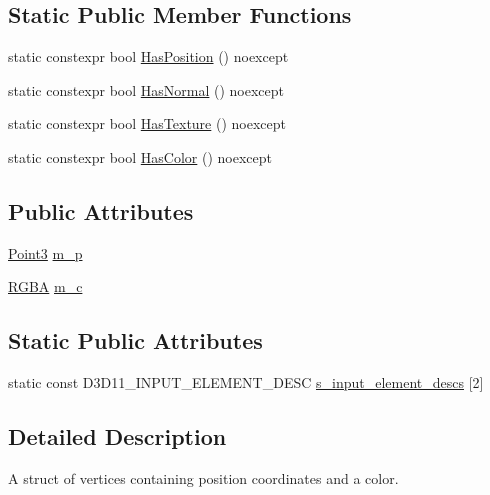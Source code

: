 \subsection*{Static Public Member Functions}
\begin{DoxyCompactItemize}
\item 
static constexpr bool \mbox{\hyperlink{structmage_1_1rendering_1_1_vertex_position_color_a9a905a75c75030b37575a7b65dff61b0}{Has\+Position}} () noexcept
\item 
static constexpr bool \mbox{\hyperlink{structmage_1_1rendering_1_1_vertex_position_color_a95f2749a6f879b4123034a78c504f3c5}{Has\+Normal}} () noexcept
\item 
static constexpr bool \mbox{\hyperlink{structmage_1_1rendering_1_1_vertex_position_color_a1498641d42122251a8612b7b40d171da}{Has\+Texture}} () noexcept
\item 
static constexpr bool \mbox{\hyperlink{structmage_1_1rendering_1_1_vertex_position_color_aea75d3acadad3cd6da04d0fc2207fc0c}{Has\+Color}} () noexcept
\end{DoxyCompactItemize}
\subsection*{Public Attributes}
\begin{DoxyCompactItemize}
\item 
\mbox{\hyperlink{structmage_1_1_point3}{Point3}} \mbox{\hyperlink{structmage_1_1rendering_1_1_vertex_position_color_a2c1c6a22bff4eca8cee086cc978d008b}{m\+\_\+p}}
\item 
\mbox{\hyperlink{structmage_1_1_r_g_b_a}{R\+G\+BA}} \mbox{\hyperlink{structmage_1_1rendering_1_1_vertex_position_color_a76bd7cc2bbec92bbaf38f72087fdd069}{m\+\_\+c}}
\end{DoxyCompactItemize}
\subsection*{Static Public Attributes}
\begin{DoxyCompactItemize}
\item 
static const D3\+D11\+\_\+\+I\+N\+P\+U\+T\+\_\+\+E\+L\+E\+M\+E\+N\+T\+\_\+\+D\+E\+SC \mbox{\hyperlink{structmage_1_1rendering_1_1_vertex_position_color_a0e9bd3e8e7cad0a5167aaeb76de9fbb3}{s\+\_\+input\+\_\+element\+\_\+descs}} \mbox{[}2\mbox{]}
\end{DoxyCompactItemize}


\subsection{Detailed Description}
A struct of vertices containing position coordinates and a color. 

